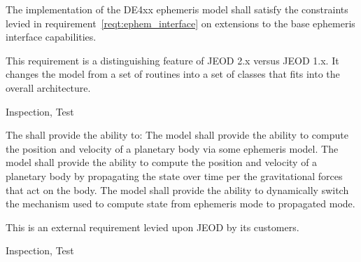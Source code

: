 \label{reqt:de4xx_ephem_interface}
\begin{description:}
\item[Requirement]
  The implementation of the DE4xx ephemeris model shall satisfy the constraints
  levied in requirement~\ref{reqt:ephem_interface} on extensions to the base
  ephemeris interface capabilities.
\item[Rationale]
  This requirement is a distinguishing feature of JEOD 2.x versus JEOD 1.x.
  It changes the model from a set of routines into a set of classes
  that fits into the overall architecture.
\item[Verification]
  Inspection, Test
\end{description:}


\label{reqt:prop_planet}
\begin{description:}
\item[Requirement]
  The \ModelDesc shall provide the ability to:
  The model shall provide the ability to compute the position and velocity
  of a planetary body via some ephemeris model.
  The model shall provide the ability to compute the position and velocity
  of a planetary body by propagating the state over time per the
  gravitational forces that act on the body.
  The model shall provide the ability to dynamically switch the mechanism
  used to compute state from ephemeris mode to propagated mode.
\item[Rationale]
  This is an external requirement levied upon JEOD by its customers.
\item[Verification]
  Inspection, Test
\end{description:}
